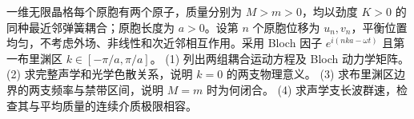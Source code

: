 一维无限晶格每个原胞有两个原子，质量分别为 \(M>m>0\)，均以劲度 \(K>0\) 的同种最近邻弹簧耦合；原胞长度为 \(a>0\)。设第 \(n\) 个原胞位移为 \(u_n,v_n\)，平衡位置均匀，不考虑外场、非线性和次近邻相互作用。采用 Bloch 因子 \(e^{i(nka-\omega t)}\) 且第一布里渊区 \(k\in[-\pi/a,\pi/a]\)。
(1) 列出两组耦合运动方程及 Bloch 动力学矩阵。
(2) 求完整声学和光学色散关系，说明 \(k=0\) 的两支物理意义。
(3) 求布里渊区边界的两支频率与禁带区间，说明 \(M=m\) 时为何闭合。
(4) 求声学支长波群速，检查其与平均质量的连续介质极限相容。
